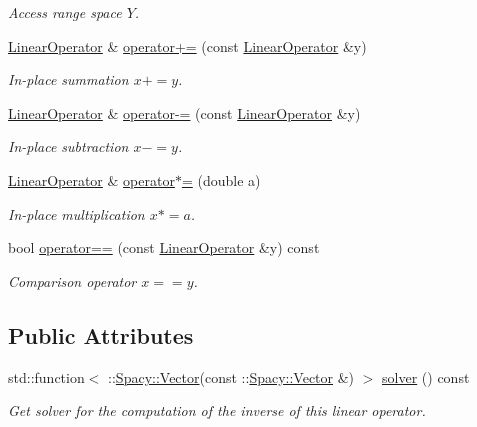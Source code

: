 \begin{DoxyCompactItemize}
\begin{DoxyCompactList}\small\item\em \-Access range space $Y$. \end{DoxyCompactList}\item 
\hyperlink{structSpacy_1_1Scalar_1_1LinearOperator}{\-Linear\-Operator} \& \hyperlink{classSpacy_1_1AddArithmeticOperators_afad1d01e1e8c6f75290ac46d9b047ea8}{operator+=} (const \hyperlink{structSpacy_1_1Scalar_1_1LinearOperator}{\-Linear\-Operator} \&y)
\begin{DoxyCompactList}\small\item\em \-In-\/place summation $ x+=y$. \end{DoxyCompactList}\item 
\hyperlink{structSpacy_1_1Scalar_1_1LinearOperator}{\-Linear\-Operator} \& \hyperlink{classSpacy_1_1AddArithmeticOperators_a9fa91e177d13203cfe8cfa991c64ca36}{operator-\/=} (const \hyperlink{structSpacy_1_1Scalar_1_1LinearOperator}{\-Linear\-Operator} \&y)
\begin{DoxyCompactList}\small\item\em \-In-\/place subtraction $ x-=y$. \end{DoxyCompactList}\item 
\hyperlink{structSpacy_1_1Scalar_1_1LinearOperator}{\-Linear\-Operator} \& \hyperlink{classSpacy_1_1AddArithmeticOperators_a1d3db95b24fd2bc1de712c9e04c47e2f}{operator$\ast$=} (double a)
\begin{DoxyCompactList}\small\item\em \-In-\/place multiplication $ x*=a$. \end{DoxyCompactList}\item 
bool \hyperlink{classSpacy_1_1AddArithmeticOperators_a5ff1909f49f4a705d69663dc2d4b6316}{operator==} (const \hyperlink{structSpacy_1_1Scalar_1_1LinearOperator}{\-Linear\-Operator} \&y) const
\begin{DoxyCompactList}\small\item\em \-Comparison operator $ x==y$. \end{DoxyCompactList}\end{DoxyCompactItemize}
\subsection*{\-Public \-Attributes}
\begin{DoxyCompactItemize}
\item 
\hypertarget{structSpacy_1_1Scalar_1_1LinearOperator_afb159b893f6a7da3f47bc8eb58f3463f}{std\-::function$<$ \-::\hyperlink{classSpacy_1_1Vector}{\-Spacy\-::\-Vector}(const \*
\-::\hyperlink{classSpacy_1_1Vector}{\-Spacy\-::\-Vector} \&) $>$ \hyperlink{structSpacy_1_1Scalar_1_1LinearOperator_afb159b893f6a7da3f47bc8eb58f3463f}{solver} () const }\label{structSpacy_1_1Scalar_1_1LinearOperator_afb159b893f6a7da3f47bc8eb58f3463f}

\begin{DoxyCompactList}\small\item\em \-Get solver for the computation of the inverse of this linear operator. \end{DoxyCompactList}\end{DoxyCompactItemize}


